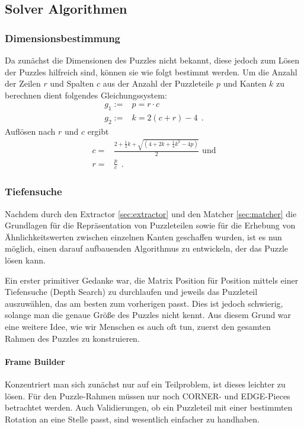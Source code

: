 \subsection{Solver Algorithmen} \label{sec:solver}
 
\subsubsection[Dimensionsbestimmung]{Dimensionsbestimmung } \label{sec:matrix_size_calculation}
Da zunächst die Dimensionen des Puzzles nicht bekannt, diese jedoch zum Lösen der Puzzles hilfreich sind, können sie wie folgt bestimmt werden.
Um die Anzahl der Zeilen $r$ und Spalten $c$ aus der Anzahl der Puzzleteile $p$ und Kanten $k$ zu berechnen dient folgendes Gleichungssystem:
\begin{align*}
    g_1 :=& p = r \cdot c \\
    g_2 :=& k = 2(c + r) - 4 ~~.
\end{align*}
Auflösen nach $r$ und $c$ ergibt
\begin{align*}
    c =& \frac{ 2 + \frac{1}{2}k + \sqrt{(4 + 2 k + \frac{1}{4}k^2 - 4 p)}}{2} \text{ und}\\
    r =& \frac{p}{c} ~~.
\end{align*}



\subsubsection[Tiefensuche]{Tiefensuche } \label{sec:depth_search}
Nachdem durch den Extractor \ref{sec:extractor} und den Matcher \ref{sec:matcher} die Grundlagen für die Repräsentation von Puzzleteilen sowie für die Erhebung von Ähnlichkeitswerten zwischen einzelnen Kanten geschaffen wurden, ist es nun möglich, einen darauf aufbauenden Algorithmus zu entwickeln, der das Puzzle lösen kann.

Ein erster primitiver Gedanke war, die Matrix Position für Position mittels einer Tiefensuche (Depth Search) zu durchlaufen und jeweils das Puzzleteil auszuwählen, das am besten zum vorherigen passt. 
Dies ist jedoch schwierig, solange man die genaue Größe des Puzzles nicht kennt. 
Aus diesem Grund war eine weitere Idee, wie wir Menschen es auch oft tun, zuerst den gesamten Rahmen des Puzzles zu konstruieren.

\paragraph{Frame Builder}
Konzentriert man sich zunächst nur auf ein Teilproblem, ist dieses leichter zu lösen. Für den Puzzle-Rahmen müssen nur noch CORNER- und EDGE-Pieces betrachtet werden. Auch Validierungen, ob ein Puzzleteil mit einer bestimmten Rotation an eine Stelle passt, sind wesentlich einfacher zu handhaben. 

